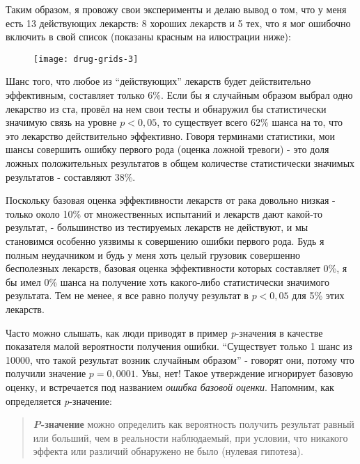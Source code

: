 Таким образом, я провожу свои эксперименты и делаю вывод о том, что у меня есть 13 действующих лекарств: 8 хороших лекарств и 5 тех, что я мог ошибочно включить в свой список (показаны красным на илюстрации ниже):


\newpage %

\begin{figure}[h!]
    \centering
    \texttt{[image: drug-grids-3]}
    \label{fig5:drug-grid-3}
\end{figure}

Шанс того, что любое из ``действующих'' лекарств будет действительно эффективным, составляет только 6\%. Если бы я случайным образом выбрал одно лекарство из ста, провёл на нем свои тесты и обнаружил бы статистически значимую связь на уровне $p<0,05$, то существует всего 62\% шанса на то, что это лекарство действительно эффективно. Говоря терминами статистики, мои шансы совершить ошибку первого рода (оценка ложной тревоги) - это доля ложных положительных результатов в общем количестве статистически значимых результатов - составляют 38\%.  

Поскольку базовая оценка эффективности лекарств от рака довольно низкая - только около 10\% от множественных испытаний и лекарств дают какой-то результат, - большинство из тестируемых лекарств не действуют, и мы становимся особенно уязвимы к совершению ошибки первого рода. Будь я полным неудачником и будь у меня хоть целый грузовик совершенно бесполезных лекарств, базовая оценка эффективности которых составляет 0\%, я бы имел 0\% шанса на получение хоть какого-либо статистически значимого результата. Тем не менее, я все равно получу результат в $p<0,05$ для 5\% этих лекарств.

Часто можно слышать, как люди приводят в пример \emph{p}-значения в качестве показателя малой вероятности получения ошибки. ``Существует только 1 шанс из 10000, что такой результат возник случайным образом'' - говорят они, потому что получили значение $p=0,0001$. Увы, нет! Такое утверждение игнорирует базовую оценку, и встречается под названием \emph{ошибка базовой оценки}. Напомним, как определяется \emph{p}-значение:

\begin{quotation}

\textbf{\emph{P}-значение} можно определить как вероятность получить результат равный или больший, чем в реальности наблюдаемый, при условии, что никакого эффекта или различий обнаружено не было (нулевая гипотеза).   

\end{quotation}


